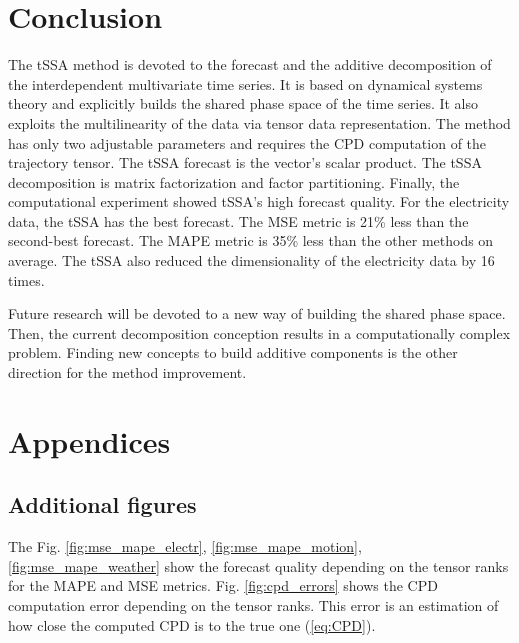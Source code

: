 \documentclass[referee, pdflatex, sn-mathphys-num]{sn-jnl}
\theoremstyle{definition}
\theoremstyle{plain}
\begin{document}
	\section{Conclusion}
	
		The tSSA method is devoted to the forecast and the additive decomposition of the interdependent multivariate time series. It is based on dynamical systems theory and explicitly builds the shared phase space of the time series. It also exploits the multilinearity of the data via tensor data representation. The method has only two adjustable parameters and requires the CPD computation of the trajectory tensor. The tSSA forecast is the vector's scalar product. The tSSA decomposition is matrix factorization and factor partitioning. Finally, the computational experiment showed tSSA's high forecast quality. For the electricity data, the tSSA has the best forecast. The MSE metric is 21\% less than the second-best forecast. The MAPE metric is 35\% less than the other methods on average. The tSSA also reduced the dimensionality of the electricity data by 16 times.
		
		Future research will be devoted to a new way of building the shared phase space. Then, the current decomposition conception results in a computationally complex problem. Finding new concepts to build additive components is the other direction for the method improvement.
		
		
		
	\appendix
		
		\section*{Appendices}
		
		\subsection*{Additional figures}
		
		The Fig. \ref{fig:mse_mape_electr}, \ref{fig:mse_mape_motion}, \ref{fig:mse_mape_weather} show the forecast quality depending on the tensor ranks for the MAPE and MSE metrics. Fig. \ref{fig:cpd_errors} shows the CPD computation error depending on the tensor ranks. This error is an estimation of how close the computed CPD is to the true one (\ref{eq:CPD}).
		
\end{document}
